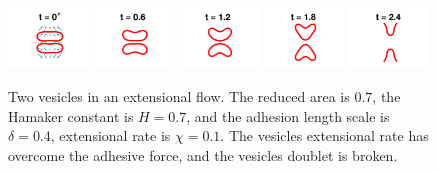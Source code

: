 \documentclass[prf,superscriptaddress,showpacs]{revtex4-1}
\begin{document}
\begin{figure}[htp]
  \includegraphics[width = 0.19\textwidth]{figs/extensional_adR4em1adS7em1Chi1em1_ra070_image01.png}
  \includegraphics[width = 0.19\textwidth]{figs/extensional_adR4em1adS7em1Chi1em1_ra070_image02.png}
  \includegraphics[width = 0.19\textwidth]{figs/extensional_adR4em1adS7em1Chi1em1_ra070_image03.png}
  \includegraphics[width = 0.19\textwidth]{figs/extensional_adR4em1adS7em1Chi1em1_ra070_image04.png}
  \includegraphics[width = 0.19\textwidth]{figs/extensional_adR4em1adS7em1Chi1em1_ra070_image05.png}
  \caption{\label{fig:extensional3} Two vesicles in an extensional flow.
  The reduced area is $0.7$, the Hamaker constant is $H = 0.7$, and the
  adhesion length scale is $\delta = 0.4$, extensional rate is $\chi =
  0.1$.  The vesicles extensional rate has overcome the adhesive force,
  and the vesicles doublet is broken.}
\end{figure}
\end{document}

